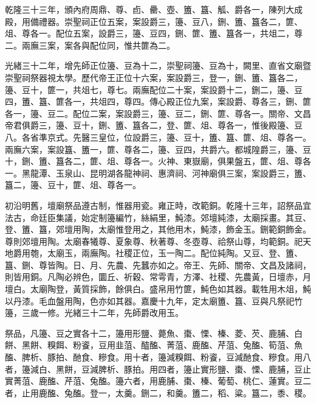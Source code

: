 \begin{pinyinscope}
乾隆三十三年，頒內府周鼎、尊、卣、罍、壺、簠、簋、觚、爵各一，陳列大成殿，用備禮器。崇聖祠正位五案，案設爵三，籩、豆八，鉶、簠、簋各二，篚、俎、尊各一。配位五案，設爵三，籩、豆四，鉶、篚、簠、簋各一，共俎二，尊二。兩廡三案，案各與配位同，惟共篚為二。

光緒三十二年，增先師正位籩、豆為十二，崇聖祠籩、豆為十，闕里、直省文廟暨崇聖祠祭器視太學。歷代帝王正位十六案，案設爵三，登一，鉶、簠、簋各二，籩、豆十，篚一，共俎七，尊七。兩廡配位二十案，案設爵十二，鉶二，籩、豆四，簠、簋、篚各一，共俎四，尊四。傳心殿正位九案，案設爵、尊各三，鉶、篚各一，籩、豆二。配位二案，案設爵三，籩、豆二，鉶、篚、尊各一。關帝、文昌帝君俱爵三，籩、豆十，鉶、簠、簋各二，登、篚、俎、尊各一，惟後殿籩、豆八。各省準京式。先醫三皇位，位設爵三，籩、豆十，簠、簋、篚、俎、尊各一。兩廡六案，案設簋、簠一，篚、尊各二，籩、豆四，共爵六。都城隍爵三，籩、豆十，鉶、簠、簋各二，篚、俎、尊各一。火神、東嶽廟，俱果盤五，篚、俎、尊各一。黑龍潭、玉泉山、昆明湖各龍神祠、惠濟祠、河神廟俱三案，案設爵三，簠、簋二，籩、豆十，篚、俎、尊各一。

初沿明舊，壇廟祭品遵古制，惟器用瓷。雍正時，改範銅。乾隆十三年，詔祭品宜法古，命廷臣集議，始定制籩編竹，絲絹里，魨漆。郊壇純漆，太廟採畫。其豆、登、簠、簋，郊壇用陶，太廟惟登用之，其他用木，魨漆，飾金玉。鉶範銅飾金。尊則郊壇用陶。太廟春犧尊、夏象尊、秋著尊、冬壺尊、祫祭山尊，均範銅。祀天地爵用匏，太廟玉，兩廡陶。社稷正位，玉一陶二。配位純陶。又豆、登、簠、簋、鉶、尊皆陶。日、月、先農、先蠶亦如之。帝王、先師、關帝、文昌及諸祠，則皆用銅。凡陶必辨色，圜丘、祈穀、常雩青，方澤、社稷、先農黃，日壇赤，月壇白。太廟陶登，黃質採飾，餘俱白。盛帛用竹篚，魨色如其器。載牲用木俎，魨以丹漆。毛血盤用陶，色亦如其器。嘉慶十九年，定太廟簠、簋、豆與凡祭祀竹籩，三歲一修。光緒三十二年，先師爵改用玉。

祭品，凡籩、豆之實各十二，籩用形鹽、薨魚、棗、慄、榛、菱、芡、鹿脯、白餅、黑餅、糗餌、粉餈，豆用韭菹、醓醢、菁菹、鹿醢、芹菹、兔醢、筍菹、魚醢、脾析、豚拍、酏食、糝食。用十者，籩減糗餌、粉餈，豆減酏食、糝食。用八者，籩減白、黑餅，豆減脾析、豚拍。用四者，籩止實形鹽、棗、慄、鹿脯，豆止實菁菹、鹿醢、芹菹、兔醢。籩六者，用鹿脯、棗、榛、葡萄、桃仁、蓮實。豆二者，止用鹿醢、兔醢。登一，太羹。鉶二，和羹。簠二，稻、粱。簋二，黍、稷。


\end{pinyinscope}
